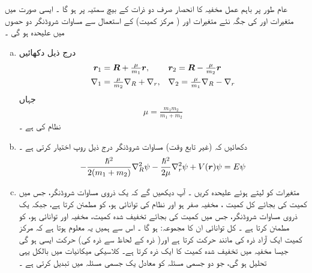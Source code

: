 عام طور پر  باہم عمل  مخفیہ  کا  انحصار صرف دو  ذرات کے بیچ سمتیہ  پر ہو گا ۔ ایسی صورت میں متغیرات   اور   کی جگہ نئے  متغیرات    اور
( مرکز کمیت)  کے  استعمال سے  مساوات شروڈنگر دو  حصوں  میں علیحدہ ہو گی ۔  
\begin{enumerate}[a.]
\item
درج ذیل    دکھائیں
\begin{align*}
 {\ensuremath{{\boldsymbol{r}}}}_1 &= {{\boldsymbol{R}}} + \tfrac{ \mu}{m_1}{{\boldsymbol{r}}}, && {{\boldsymbol{r}}}_2 = {{\boldsymbol{R}}} - \tfrac{ \mu }{ m_2 } {{\boldsymbol{r}}}\\
  \nabla_1& = \tfrac{ \mu }{ m_2 }\nabla_R + \nabla_r , &&  \nabla_2 = \tfrac{ \mu }{ m_1 } \nabla_R - \nabla_r
\end{align*}
جہاں 
\begin{align}\label{مساوات_متماثل_تخفیف_شدہ_کمیت}
\mu = \frac{ m_1 m_2 }{ m_1 + m_2 }
\end{align}
نظام کی   ہے ۔
\item 
  دکھائیں کہ (غیر تابع وقت) مساوات   شروڈنگر    درج ذیل روپ اختیار کرتی ہے ۔
\begin{align*}
- \frac{ \hslash^2 }{ 2 ( m_1 + m_2 ) } \nabla_R^2  \psi - \frac{ \hslash^2 }{ 2 \mu }\nabla_r^2 { \psi } + V({{\boldsymbol{r}}}) \psi = E \psi
\end{align*}
\item
 متغیرات کو   لیتے ہوئے علیحدہ کریں ۔ آپ دیکھیں گے کہ    یک ذروی مساوات   شروڈنگر، جس میں کمیت  کی بجائے  کل کمیت  ، مخفیہ  صفر ہو اور نظام کی توانائی   ہو،   کو مطمئن کرتا ہے،   جبکہ   یک ذروی   مساوات شروڈنگر، جس میں کمیت  کی بجائے  تخفیف شدہ کمیت، مخفیہ    اور توانائی  ہو، کو مطمئن کرتا ہے ۔ کل توانائی  ان کا مجموعہ:    ہو گا ۔ اس سے ہمیں یہ معلوم ہوتا ہے  کہ مرکز  کمیت ایک آزاد ذرہ کی مانند  حرکت کرتا ہے اور(  ذرہ   کے لحاظ سے ذرہ    کی)   حرکت ایسی  ہو گی جیسا مخفیہ  میں تخفیف شدہ کمیت کا ایک ذرہ   کرتا ہے۔ کلاسیکی میکانیات میں  بالکل یہی تحلیل ہو گی،     جو دو  جسمی  مسئلہ کو معادل یک جسمی مسئلہ میں  تبدیل کرتی ہے ۔ 
\end{enumerate}
